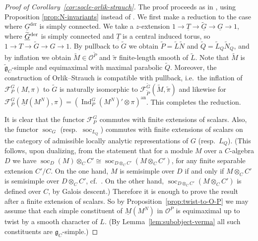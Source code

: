 \documentclass[a4paper]{amsart}
\numberwithin{equation}{section}
\theoremstyle{remark}
\theoremstyle{definition}
\DeclareMathOperator{\Ind}{Ind}
\DeclareMathOperator{\soc}{soc}
\newcommand{\alggrp}[1]{\underline{#1}}
\newcommand{\an}{\mathrm{an}}
\newcommand{\der}{\mathrm{der}}
\newcommand{\lowprime}[1][\prime]{
  \mathchoice
    {\raisebox{-0.7ex}{$\scriptstyle #1$}}
    {\raisebox{-0.7ex}{$\scriptstyle #1$}}
    {\raisebox{-0.7ex}{$\scriptstyle #1$}}
    {\raisebox{-0.3ex}{$\scriptscriptstyle #1$}}
}
\newcommand{\wt}[1]{\widetilde{#1}}
\begin{document}
\begin{proof}[Proof of Corollary~\ref{cor:socle-orlik-strauch}]
  The proof proceeds as in \cite{socle1}, using Proposition \ref{prop:N-invariants} instead of \cite[Proposition~2.4]{socle1}.
  We first make a reduction to the case where $\alggrp{G}^{\der}$ is simply connected.
  We take a $z$-extension $1 \to \alggrp T \to \wt {\alggrp G} \to \alggrp G \to 1$, where ${\wt{\alggrp{G}}}^{\lowprime[\der]}$ is simply connected and $\alggrp T$ is a central induced torus, so $1 \to T \to \wt G \to G \to 1$.
  By pullback to $\wt G$ we obtain $\wt P = \wt L \wt N$ and $\wt Q = \wt L_Q \wt N_Q$, and by inflation we obtain $\wt M \in \mathcal O^{\wt P}$ and $\wt\pi$ finite-length smooth of $\wt L$.
  Note that $\wt M$ is $\wt{\mathfrak{g}}_{C}$-simple and equimaximal with maximal parabolic $\wt Q$.
  Moreover, the construction of Orlik--Strauch is compatible with pullback, i.e.\ the inflation of $\mathcal F_P^G(M,\pi)$ to $\wt G$ is naturally isomorphic to $\mathcal F_{\wt P}^{\wt G}(\wt M,\wt \pi)$ and likewise for $\mathcal F_P^G(\underline M(M^N),\pi) = (\Ind_P^G (M^N)' \otimes \pi)^{\an}$.
  This completes the reduction.

  It is clear that the functor $\mathcal{F}_P^G$ commutes with finite extensions of scalars.
  Also, the functor $\soc_G$ (resp.\ $\soc_{L_Q}$) commutes with finite extensions of scalars on the category of admissible locally analytic representations of $G$ (resp.\ $L_Q$).
  (This follows, upon dualizing, from the statement that for a module $M$ over a $C$-algebra $D$ we have $\soc_D(M) \otimes_C C' \cong \soc_{D\otimes_C C'}(M\otimes_C C')$, for any finite separable extension $C'/C$.
  On the one hand, $M$ is semisimple over $D$ if and only if $M \otimes_C C'$ is semisimple over $D \otimes_C C'$, cf.\ \cite[\S12.7]{MR3027127}.
  On the other hand, $\soc_{D\otimes_C C'}(M\otimes_C C')$ is defined over $C$, by Galois descent.)
  Therefore it is enough to prove the result after a finite extension of scalars.
  So by Proposition~\ref{prop:twist-to-O-P} we may assume that each simple constituent of $\underline M(M^N)$ in $\mathcal{O}^{P}$ is equimaximal
  up to twist by a smooth character of $L$. (By Lemma~\ref{lem:subobject-verma} all such constituents are $\mathfrak{g}_{C}$-simple.)


\end{proof}
\end{document}
